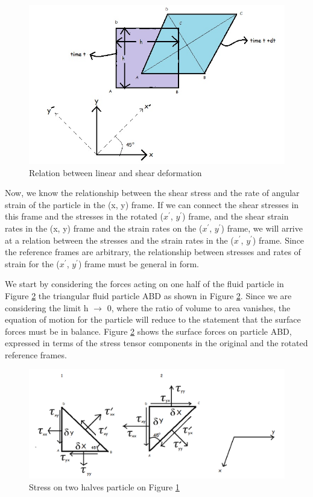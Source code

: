 \documentclass{article}
\begin{document}
{\begin{figure}[h!]
\centering
\includegraphics[scale=.9]{Relation between linear and shear deformation.jpg}
\caption{Relation between linear and shear deformation}
\label{fig:Reln_betn_lin_&_shr_dfrmtn}
\end{figure}

Now, we know the relationship between the shear stress and the rate of angular strain of the particle in the (x, y) frame. If we can connect the shear stresses in this frame and the stresses in the rotated ($x^{'}$, $y^{'}$) frame, and the shear strain rates in the (x, y) frame and the
strain rates on the ($x^{'}$, $y^{'}$) frame, we will arrive at a relation between the stresses and the strain rates in the ($x^{'}$, $y^{'}$) frame. Since the reference frames are arbitrary, the relationship between stresses and rates of strain for the ($x^{'}$, $y^{'}$) frame must be general in form.

We start by considering the forces acting on one half of the fluid particle in Figure \ref{fig:stress_on_2_1_2_particle} the triangular fluid particle ABD as shown in Figure \ref{fig:stress_on_2_1_2_particle}. Since we are considering the limit h $\to$ 0, where the ratio of volume to area vanishes, the equation of motion for the particle will reduce to the statement that the surface forces must be in balance. Figure \ref{fig:stress_on_2_1_2_particle} shows the surface forces on particle ABD, expressed in terms of the stress tensor components in the original and the rotated reference frames.

\begin{figure}[h!]
\centering
\includegraphics[scale=.6]{Stress on two halves particle.png}
\caption{Stress on two halves particle on Figure \ref{fig:Reln_betn_lin_&_shr_dfrmtn}}
\label{fig:stress_on_2_1_2_particle}
\end{figure}

}
\end{document}
